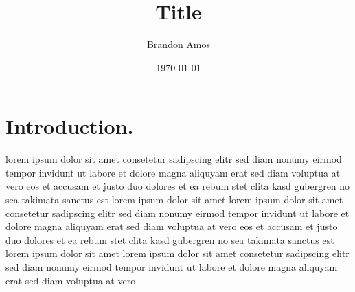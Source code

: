 \documentclass[12pt]{article}
\title{Title}
\author{Brandon Amos}
\date{\today}
\begin{document}
\maketitle

\section{Introduction.}
lorem ipsum dolor sit amet consetetur sadipscing elitr sed diam nonumy
eirmod tempor invidunt ut labore et dolore magna aliquyam erat sed diam
voluptua at vero eos et accusam et justo duo dolores et ea rebum stet clita
kasd gubergren no sea takimata sanctus est lorem ipsum dolor sit amet lorem
ipsum dolor sit amet consetetur sadipscing elitr sed diam nonumy eirmod
tempor invidunt ut labore et dolore\cite{article}
magna aliquyam erat sed diam voluptua at
vero eos et accusam et justo duo dolores et ea rebum stet clita kasd
gubergren no sea takimata sanctus est lorem ipsum dolor sit amet lorem ipsum
dolor sit amet consetetur sadipscing elitr sed diam nonumy eirmod tempor
invidunt ut labore et dolore magna aliquyam erat sed diam voluptua at vero



\end{document}

